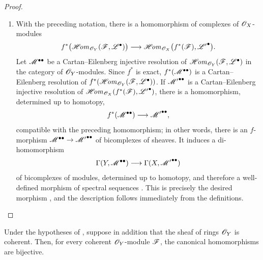 \begin{proof}
\begin{enumerate}
  \item[\rm(ii)]
  With the preceding notation, there is a homomorphism of complexes of
  $\mathscr{O}_X$-modules
  \[
    f^*\bigl(\mathscr{H}\!\mathit{om}_{\mathscr{O}_Y}(\mathscr{F},\mathscr{L}^\bullet)\bigr)
    \longrightarrow
    \mathscr{H}\!\mathit{om}_{\mathscr{O}_X}
      \bigl(f^*(\mathscr{F}),{\mathscr{L}'}^\bullet\bigr).
  \]
  Let $\mathscr{M}^{\bullet\bullet}$ be a Cartan--Eilenberg injective
  resolution of
  $\mathscr{H}\!\mathit{om}_{\mathscr{O}_Y}(\mathscr{F},\mathscr{L}^\bullet)$ in the category of
  $\mathscr{O}_Y$-modules.  Since $f^*$ is exact,
  $f^*(\mathscr{M}^{\bullet\bullet})$ is a Cartan--Eilenberg resolution of
  $f^*(\mathscr{H}\!\mathit{om}_{\mathscr{O}_Y}(\mathscr{F},\mathscr{L}^\bullet))$.
  If ${\mathscr{M}'}^{\bullet\bullet}$ is a Cartan--Eilenberg injective
  resolution of
  $\mathscr{H}\!\mathit{om}_{\mathscr{O}_X}(f^*(\mathscr{F}),{\mathscr{L}'}^\bullet)$, there is
   a homomorphism, determined up to homotopy,
  \[
    f^*(\mathscr{M}^{\bullet\bullet})
    \longrightarrow{\mathscr{M}'}^{\bullet\bullet},
  \]
  compatible with the preceding homomorphism; in other words, there
  is an $f$-morphism
  $\mathscr{M}^{\bullet\bullet}\to{\mathscr{M}'}^{\bullet\bullet}$ of
  bicomplexes of sheaves.
  It induces a di-homomorphism
  \[
    \Gamma(Y,\mathscr{M}^{\bullet\bullet})
    \longrightarrow\Gamma(X,{\mathscr{M}'}^{\bullet\bullet})
  \]
  of bicomplexes of modules, determined up to homotopy, and therefore
  a well-defined morphism of spectral sequences
  .  This is precisely the desired morphism
  , and the description
   follows immediately from the definitions.
\end{enumerate}
\end{proof}

\begin{proposition}[12.3.5]
\label{0.12.3.5}
Under the hypotheses of , suppose in addition that the
sheaf of rings $\mathscr{O}_Y$ is coherent.
Then, for every coherent $\mathscr{O}_Y$-module $\mathscr{F}$, the canonical
homomorphisms  are bijective.
\end{proposition}

